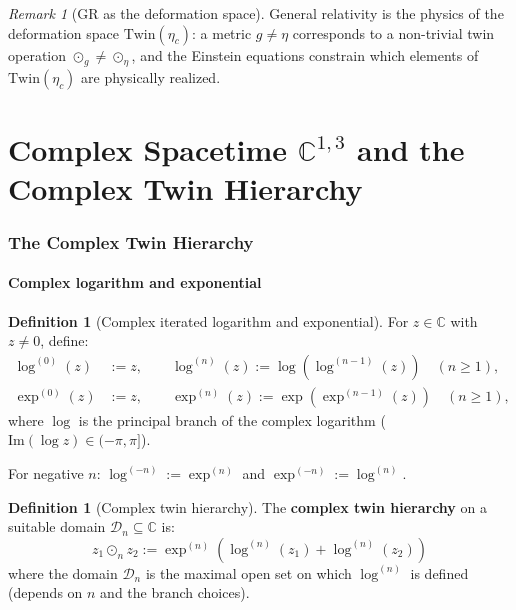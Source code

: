 \documentclass[12pt]{article}
\theoremstyle{plain}
\theoremstyle{definition}
\newtheorem{definition}[theorem]{Definition}
\theoremstyle{remark}
\newtheorem{remark}[theorem]{Remark}
\newcommand{\Twin}{\mathrm{Twin}}
\newcommand{\CC}{\mathbb{C}}
\begin{document}
\begin{remark}[GR as the deformation space]
General relativity is the physics of the deformation space $\Twin(\eta_c)$: a metric $g \neq \eta$ corresponds to a non-trivial twin operation $\odot_g \neq \odot_\eta$, and the Einstein equations constrain which elements of $\Twin(\eta_c)$ are physically realized.
\end{remark}



\part{Complex Spacetime $\CC^{1,3}$ and the Complex Twin Hierarchy}

\section{The Complex Twin Hierarchy}
\label{sec:complex-hierarchy}

\subsection{Complex logarithm and exponential}

\begin{definition}[Complex iterated logarithm and exponential]\label{def:complex-iter}
For $z \in \CC$ with $z \neq 0$, define:
\begin{align}
\log^{(0)}(z) &:= z, \qquad \log^{(n)}(z) := \log(\log^{(n-1)}(z)) \quad (n \geq 1), \\
\exp^{(0)}(z) &:= z, \qquad \exp^{(n)}(z) := \exp(\exp^{(n-1)}(z)) \quad (n \geq 1),
\end{align}
where $\log$ is the principal branch of the complex logarithm ($\mathrm{Im}(\log z) \in (-\pi, \pi]$).

For negative $n$: $\log^{(-n)} := \exp^{(n)}$ and $\exp^{(-n)} := \log^{(n)}$.
\end{definition}

\begin{definition}[Complex twin hierarchy]\label{def:complex-twin}
The \textbf{complex twin hierarchy} on a suitable domain $\mathcal{D}_n \subseteq \CC$ is:
\begin{equation}\label{eq:complex-twin}
\boxed{z_1 \odot_n z_2 := \exp^{(n)}(\log^{(n)}(z_1) + \log^{(n)}(z_2))}
\end{equation}
where the domain $\mathcal{D}_n$ is the maximal open set on which $\log^{(n)}$ is defined (depends on $n$ and the branch choices).
\end{definition}
\end{document}
